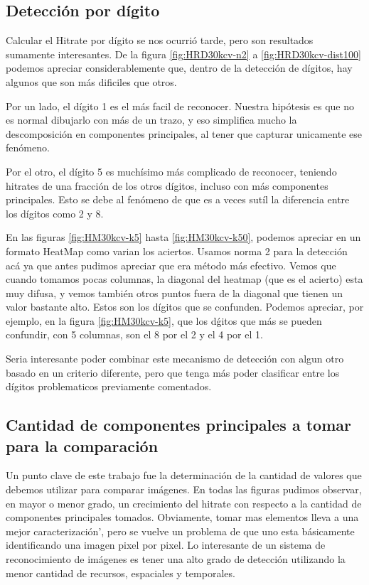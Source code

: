 \subsection{Detecci\'on por d\'igito}
Calcular el Hitrate por d\'igito se nos ocurri\'o tarde, pero son resultados
sumamente interesantes. De la figura \ref{fig:HRD30kcv-n2} a \ref{fig:HRD30kcv-dist100}
podemos apreciar considerablemente que, dentro de
la detecci\'on de d\'igitos, hay algunos que son m\'as dificiles que otros.

Por un lado, el d\'igito 1 es el m\'as facil de reconocer. Nuestra hip\'otesis
es que no es normal dibujarlo con m\'as de un trazo, y eso simplifica mucho la
descomposici\'on en componentes principales, al tener que capturar unicamente ese
fen\'omeno.

Por el otro, el d\'igito 5 es much\'isimo m\'as complicado de reconocer, teniendo
hitrates de una fracci\'on de los otros d\'igitos, incluso con m\'as componentes
principales. Esto se debe al fen\'omeno de que es a veces sut\'il la diferencia
entre los d\'igitos como 2 y 8.

En las figuras \ref{fig:HM30kcv-k5} hasta \ref{fig:HM30kcv-k50}, podemos apreciar
en un formato HeatMap como varian los aciertos. Usamos norma 2 para la detecci\'on ac\'a
ya que antes pudimos apreciar que era m\'etodo m\'as efectivo. Vemos que cuando tomamos pocas
columnas, la diagonal del heatmap (que es el acierto) esta muy difusa, y vemos tambi\'en
otros puntos fuera de la diagonal que tienen un valor bastante alto. Estos son los d\'igitos
que se confunden. Podemos apreciar, por ejemplo, en la figura \ref{fig:HM30kcv-k5}, que
los d\'gitos que m\'as se pueden confundir, con 5 columnas, son el 8 por el 2 y el 4 por el 1.

Seria interesante poder combinar este mecanismo de detecci\'on con algun otro basado en un
criterio diferente, pero que tenga m\'as poder clasificar entre los d\'igitos problematicos
previamente comentados.


\subsection{Cantidad de componentes principales a tomar para la comparaci\'on}
Un punto clave de este trabajo fue la determinaci\'on de la cantidad de valores que debemos
utilizar para comparar im\'agenes. En todas las figuras pudimos observar, en mayor o menor
grado, un crecimiento del hitrate con respecto a la cantidad de componentes principales tomados.
Obviamente, tomar mas elementos lleva a una mejor caracterizaci\'on', pero se vuelve un problema
de que uno esta b\'asicamente identificando una imagen pixel por pixel. Lo interesante de un
sistema de reconocimiento de im\'agenes es tener una alto grado de detecci\'on utilizando la menor
cantidad de recursos, espaciales y temporales.


